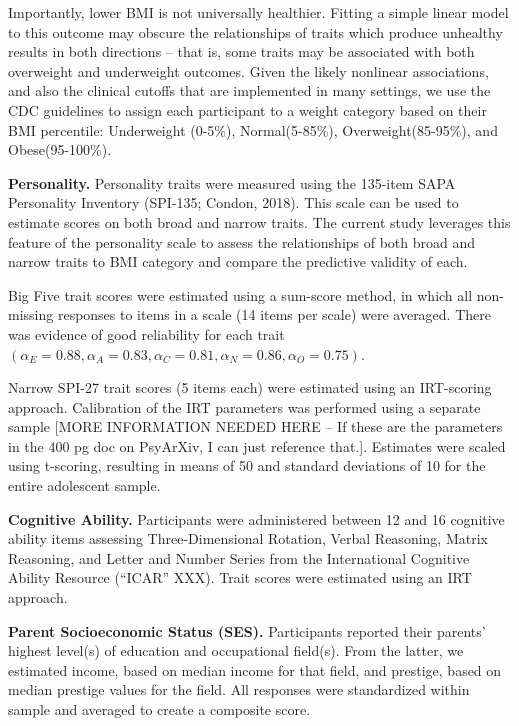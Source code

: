 \documentclass[man]{apa6}
\begin{document}
Importantly, lower BMI is not universally healthier. Fitting a simple linear model to this outcome may obscure the relationships of traits which produce unhealthy results in both directions -- that is, some traits may be associated with both overweight and underweight outcomes. Given the likely nonlinear associations, and also the clinical cutoffs that are implemented in many settings, we use the CDC guidelines to assign each participant to a weight category based on their BMI percentile: Underweight (0-5\%), Normal(5-85\%), Overweight(85-95\%), and Obese(95-100\%).

\textbf{Personality.} Personality traits were measured using the 135-item SAPA Personality Inventory (SPI-135; Condon, 2018). This scale can be used to estimate scores on both broad and narrow traits. The current study leverages this feature of the personality scale to assess the relationships of both broad and narrow traits to BMI category and compare the predictive validity of each.

Big Five trait scores were estimated using a sum-score method, in which all non-missing responses to items in a scale (14 items per scale) were averaged. There was evidence of good reliability for each trait \(( \alpha_E = 0.88, \alpha_A = 0.83, \alpha_C = 0.81, \alpha_N = 0.86, \alpha_O = 0.75)\).

Narrow SPI-27 trait scores (5 items each) were estimated using an IRT-scoring approach. Calibration of the IRT parameters was performed using a separate sample {[}MORE INFORMATION NEEDED HERE -- If these are the parameters in the 400 pg doc on PsyArXiv, I can just reference that.{]}. Estimates were scaled using t-scoring, resulting in means of 50 and standard deviations of 10 for the entire adolescent sample.

\textbf{Cognitive Ability.} Participants were administered between 12 and 16 cognitive ability items assessing Three-Dimensional Rotation, Verbal Reasoning, Matrix Reasoning, and Letter and Number Series from the International Cognitive Ability Resource (\enquote{ICAR} XXX). Trait scores were estimated using an IRT approach.

\textbf{Parent Socioeconomic Status (SES).} Participants reported their parents' highest level(s) of education and occupational field(s). From the latter, we estimated income, based on median income for that field, and prestige, based on median prestige values for the field. All responses were standardized within sample and averaged to create a composite score.
\end{document}
